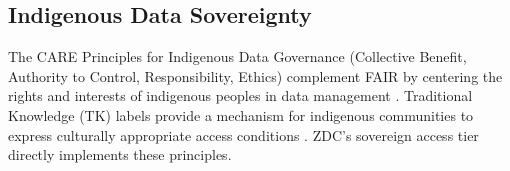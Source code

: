\subsection{Indigenous Data Sovereignty}

The CARE Principles for Indigenous Data Governance (Collective Benefit, Authority to Control, Responsibility, Ethics) complement FAIR by centering the rights and interests of indigenous peoples in data management \citep{carroll2020care}.
Traditional Knowledge (TK) labels provide a mechanism for indigenous communities to express culturally appropriate access conditions \citep{anderson2010tk}.
ZDC's sovereign access tier directly implements these principles.


